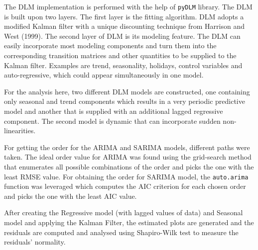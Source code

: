 \documentclass[a4paper,12pt]{article}
\begin{document}
The DLM implementation is performed with the help of \texttt{pyDLM} library. The DLM is built upon two layers. The first layer is the fitting algorithm. DLM adopts a modified Kalman filter with a unique discounting technique from Harrison and West (1999). The second layer of DLM is its modeling feature. The DLM can easily incorporate most modeling components and turn them into the corresponding transition matrices and other quantities to be supplied to the Kalman filter. Examples are trend, seasonality, holidays, control variables and auto-regressive, which could appear simultaneously in one model.

For the analysis here, two different DLM models are constructed, one containing only seasonal and trend components which results in a very periodic predictive model and another that is supplied with an additional lagged regressive component. The second model is dynamic that can incorporate sudden non-linearities.

For getting the order for the ARIMA and SARIMA models, different paths were taken. The ideal order value for ARIMA was found using the grid-search method that enumerates all possible combinations of the order and picks the one with the least RMSE value. For obtaining the order for SARIMA model, the \texttt{auto.arima} function was leveraged which computes the AIC criterion for each chosen order and picks the one with the least AIC value.

After creating the Regressive model (with lagged values of data) and Seasonal model and applying the Kalman Filter, the estimated plots are generated and the residuals are computed and analysed using Shapiro-Wilk test to measure the residuals' normality. \\[0pt]
\end{document}
